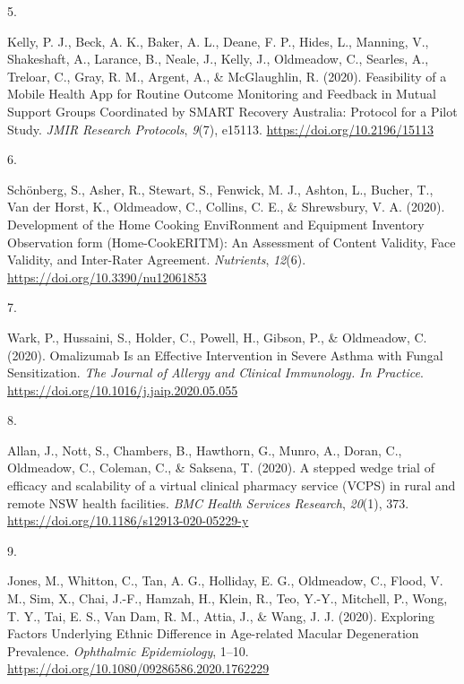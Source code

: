 \documentclass[11pt, a4paper]{awesome-cv}
\newlength{\csllabelwidth}
\newcommand{\CSLLeftMargin}[1]{\parbox[t]{\csllabelwidth}{#1}}
\newcommand{\CSLRightInline}[1]{\parbox[t]{\linewidth - \csllabelwidth}{#1}}
\begin{document}
\leavevmode\hypertarget{ref-kelly_feasibility_2020}{}%
\CSLLeftMargin{5. }
\CSLRightInline{Kelly, P. J., Beck, A. K., Baker, A. L., Deane, F. P.,
Hides, L., Manning, V., Shakeshaft, A., Larance, B., Neale, J., Kelly,
J., Oldmeadow, C., Searles, A., Treloar, C., Gray, R. M., Argent, A., \&
McGlaughlin, R. (2020). Feasibility of a Mobile Health App for Routine
Outcome Monitoring and Feedback in Mutual Support Groups Coordinated by
SMART Recovery Australia: Protocol for a Pilot Study. \emph{JMIR
Research Protocols}, \emph{9}(7), e15113.
\url{https://doi.org/10.2196/15113}}

\leavevmode\hypertarget{ref-schonberg_development_2020}{}%
\CSLLeftMargin{6. }
\CSLRightInline{Schönberg, S., Asher, R., Stewart, S., Fenwick, M. J.,
Ashton, L., Bucher, T., Van der Horst, K., Oldmeadow, C., Collins, C.
E., \& Shrewsbury, V. A. (2020). Development of the Home Cooking
EnviRonment and Equipment Inventory Observation form (Home-CookERITM):
An Assessment of Content Validity, Face Validity, and Inter-Rater
Agreement. \emph{Nutrients}, \emph{12}(6).
\url{https://doi.org/10.3390/nu12061853}}

\leavevmode\hypertarget{ref-wark_omalizumab_2020}{}%
\CSLLeftMargin{7. }
\CSLRightInline{Wark, P., Hussaini, S., Holder, C., Powell, H., Gibson,
P., \& Oldmeadow, C. (2020). Omalizumab Is an Effective Intervention in
Severe Asthma with Fungal Sensitization. \emph{The Journal of Allergy
and Clinical Immunology. In Practice}.
\url{https://doi.org/10.1016/j.jaip.2020.05.055}}

\leavevmode\hypertarget{ref-allan_stepped_2020}{}%
\CSLLeftMargin{8. }
\CSLRightInline{Allan, J., Nott, S., Chambers, B., Hawthorn, G., Munro,
A., Doran, C., Oldmeadow, C., Coleman, C., \& Saksena, T. (2020). A
stepped wedge trial of efficacy and scalability of a virtual clinical
pharmacy service (VCPS) in rural and remote NSW health facilities.
\emph{BMC Health Services Research}, \emph{20}(1), 373.
\url{https://doi.org/10.1186/s12913-020-05229-y}}

\leavevmode\hypertarget{ref-jones_exploring_2020}{}%
\CSLLeftMargin{9. }
\CSLRightInline{Jones, M., Whitton, C., Tan, A. G., Holliday, E. G.,
Oldmeadow, C., Flood, V. M., Sim, X., Chai, J.-F., Hamzah, H., Klein,
R., Teo, Y.-Y., Mitchell, P., Wong, T. Y., Tai, E. S., Van Dam, R. M.,
Attia, J., \& Wang, J. J. (2020). Exploring Factors Underlying Ethnic
Difference in Age-related Macular Degeneration Prevalence.
\emph{Ophthalmic Epidemiology}, 1--10.
\url{https://doi.org/10.1080/09286586.2020.1762229}}
\end{document}
